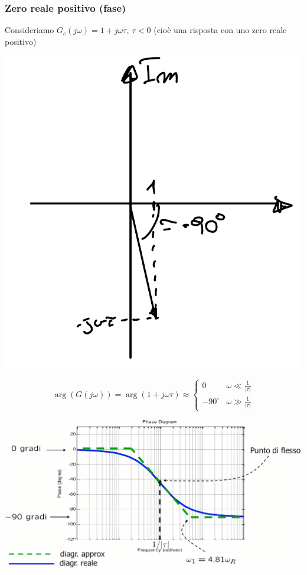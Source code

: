 \documentclass{article}
\numberwithin{equation}{subsection}
\begin{document}
\subsubsection{Zero reale positivo (fase)}
Consideriamo $G_c(j\omega) = 1 + j\omega \tau,\  \tau <0$ (cioè una risposta con uno zero reale positivo)
\begin{center}
    \includegraphics[scale=0.15]{Images/Diagramma_zero_reale_positivo_1.png}
\end{center}
\[
    \arg(G(j\omega)) = \arg(1+j\omega\tau) \approx 
    \begin{cases}
        0 & \omega \ll \frac{1}{|\tau|}\\
        -90^{\circ} & \omega \gg \frac{1}{|\tau|}
    \end{cases}   
\]
\begin{center}
    \includegraphics[scale=0.125]{Images/Diagramma_zero_reale_positivo_2.png}
\end{center}
\end{document}
